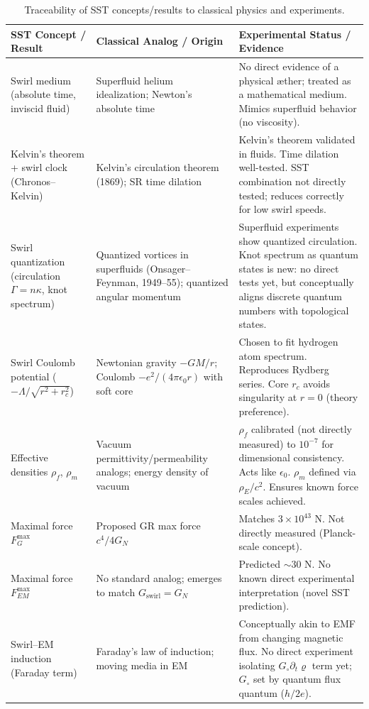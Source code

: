 \documentclass[reprint,aps,onecolumn,nofootinbib]{revtex4-2}
\begin{document}
	\begin{table}[hbt!]
		\caption{Traceability of SST concepts/results to classical physics and experiments.}
		\label{tab:trace}
        \footnotesize
		\begin{ruledtabular}
			\begin{tabular}{|p{3.0cm} p{4.0cm} p{8.0cm}|}
				\textbf{SST Concept / Result} & \textbf{Classical Analog / Origin} & \textbf{Experimental Status / Evidence} \\
				\hline
				Swirl medium (absolute time, inviscid fluid) & Superfluid helium idealization; Newton’s absolute time & No direct evidence of a physical æther; treated as a mathematical medium. Mimics superfluid behavior (no viscosity). \\
				Kelvin’s theorem + swirl clock (Chronos–Kelvin) & Kelvin’s circulation theorem (1869); SR time dilation & Kelvin’s theorem validated in fluids. Time dilation well-tested. SST combination not directly tested; reduces correctly for low swirl speeds. \\
				Swirl quantization (circulation $\Gamma = n\kappa$, knot spectrum) & Quantized vortices in superfluids (Onsager–Feynman, 1949–55); quantized angular momentum & Superfluid experiments show quantized circulation. Knot spectrum as quantum states is new: no direct tests yet, but conceptually aligns discrete quantum numbers with topological states. \\
				Swirl Coulomb potential ($-\Lambda/\sqrt{r^2+r_c^2}$) & Newtonian gravity $-GM/r$; Coulomb $-e^2/(4\pi\epsilon_0 r)$ with soft core & Chosen to fit hydrogen atom spectrum. Reproduces Rydberg series. Core $r_c$ avoids singularity at $r=0$ (theory preference). \\
				Effective densities $\rho_f$, $\rho_m$ & Vacuum permittivity/permeability analogs; energy density of vacuum & $\rho_f$ calibrated (not directly measured) to $10^{-7}$ for dimensional consistency. Acts like $\epsilon_0$. $\rho_m$ defined via $\rho_E/c^2$. Ensures known force scales achieved. \\
				Maximal force $F_{\!G}^{\max}$ & Proposed GR max force $c^4/4G_N$ & Matches $3\times10^{43}$ N. Not directly measured (Planck-scale concept). \\
				Maximal force $F_{\!EM}^{\max}$ & No standard analog; emerges to match $G_{\text{swirl}}=G_N$ & Predicted $\sim30$ N. No known direct experimental interpretation (novel SST prediction). \\
				Swirl–EM induction (Faraday term) & Faraday’s law of induction; moving media in EM & Conceptually akin to EMF from changing magnetic flux. No direct experiment isolating $G_{\circ}\partial_t\varrho$ term yet; $G_{\circ}$ set by quantum flux quantum ($h/2e$). \\

\end{tabular}
\end{ruledtabular}
\end{table}
\end{document}
